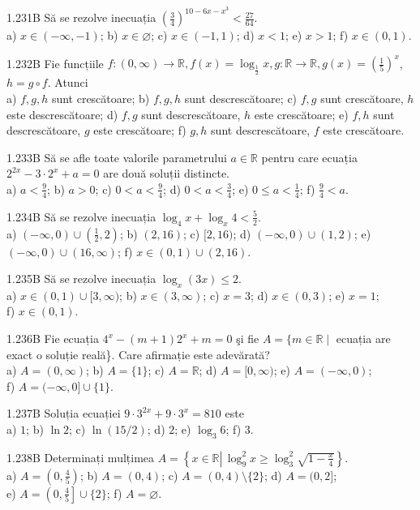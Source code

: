 \documentclass[11pt]{article}
\begin{document}
1.231B Să se rezolve inecuația $\left(\frac{3}{4}\right)^{10-6 x-x^{3}}<\frac{27}{64}$.\\ a) $x \in(-\infty,-1)$; b) $x \in \varnothing$; c) $x \in(-1,1)$; d) $x<1$; e) $x>1$; f) $x \in(0,1)$.

1.232B Fie funcțiile $f:(0, \infty) \rightarrow \mathbb{R}, f(x)=\log _{\frac{1}{2}} x, g: \mathbb{R} \rightarrow \mathbb{R}, g(x)=\left(\frac{1}{5}\right)^{x}$, $h=g \circ f$. Atunci\\ a) $f, g, h$ sunt crescătoare; b) $f, g, h$ sunt descrescătoare; c) $f, g$ sunt crescătoare, $h$ este descrescătoare; d) $f, g$ sunt descrescătoare, $h$ este crescătoare; e) $f, h$ sunt descrescătoare, $g$ este crescătoare; f) $g, h$ sunt descrescătoare, $f$ este crescătoare.

1.233B Să se afle toate valorile parametrului $a \in \mathbb{R}$ pentru care ecuația $2^{2 x}-3 \cdot 2^{x}+a=0$ are două soluții distincte.\\ a) $a<\frac{9}{4}$; b) $a>0$; c) $0<a<\frac{9}{4}$; d) $0<a<\frac{3}{4}$; e) $0 \leq a<\frac{1}{4}$; f) $\frac{9}{4}<a$.

1.234B Să se rezolve inecuația $\log _{4} x+\log _{x} 4<\frac{5}{2}$.\\ a) $(-\infty, 0) \cup\left(\frac{1}{2}, 2\right)$; b) $(2,16)$; c) $[2,16)$; d) $(-\infty, 0) \cup(1,2)$; e) $(-\infty, 0) \cup(16, \infty)$; f) $x \in(0,1) \cup(2,16)$.

1.235B Să se rezolve inecuația $\log _{x}(3 x) \leq 2$.\\ a) $x \in(0,1) \cup[3, \infty)$; b) $x \in(3, \infty)$; c) $x=3$; d) $x \in(0,3)$; e) $x=1$;\\ f) $x \in(0,1)$.

1.236B Fie ecuația $4^{x}-(m+1) 2^{x}+m=0$ şi fie $A=\{m \in \mathbb{R} \mid$ ecuația are exact o soluție reală\}. Care afirmație este adevărată?\\ a) $A=(0, \infty)$; b) $A=\{1\}$; c) $A=\mathbb{R}$; d) $A=[0, \infty)$; e) $A=(-\infty, 0)$;\\ f) $A=(-\infty, 0] \cup\{1\}$.

1.237B Soluția ecuației $9 \cdot 3^{2 x}+9 \cdot 3^{x}=810$ este\\ a) $1$; b) $\ln 2$; c) $\ln (15 / 2)$; d) $2$; e) $\log _{3} 6$; f) $3$.

1.238B Determinați mulțimea $A=\left\{x \in \mathbb{R} \left\lvert\, \log _{9}^{2} x \geq \log _{3}^{2} \sqrt{1-\frac{x}{4}}\right.\right\}$.\\ a) $A=\left(0, \frac{4}{5}\right)$; b) $A=(0,4)$; c) $A=(0,4) \setminus\{2\}$; d) $A=(0,2]$;\\ e) $A=\left(0, \frac{4}{5}\right] \cup\{2\}$; f) $A=\varnothing$.
\end{document}
